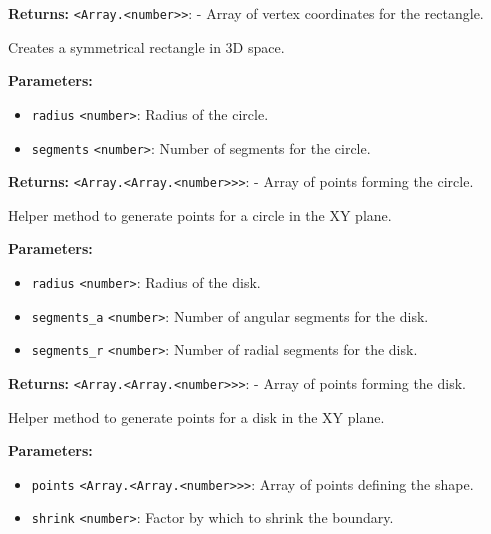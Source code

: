\documentclass[12pt,a4paper]{article}
\begin{document}
\noindent \textbf{Returns:} \texttt{<Array.<number>>}: - Array of vertex coordinates for the rectangle.

\noindent Creates a symmetrical rectangle in 3D space.

\vspace{5mm}
\noindent {}


\noindent \textbf{Parameters:}
\begin{itemize}
  \item \texttt{radius} \texttt{<number>}: Radius of the circle.
  \item \texttt{segments} \texttt{<number>}: Number of segments for the circle.
\end{itemize}

\noindent \textbf{Returns:} \texttt{<Array.<Array.<number>>>}: - Array of points forming the circle.

\noindent Helper method to generate points for a circle in the XY plane.

\vspace{5mm}
\noindent {}


\noindent \textbf{Parameters:}
\begin{itemize}
  \item \texttt{radius} \texttt{<number>}: Radius of the disk.
  \item \texttt{segments\_a} \texttt{<number>}: Number of angular segments for the disk.
  \item \texttt{segments\_r} \texttt{<number>}: Number of radial segments for the disk.
\end{itemize}

\noindent \textbf{Returns:} \texttt{<Array.<Array.<number>>>}: - Array of points forming the disk.

\noindent Helper method to generate points for a disk in the XY plane.

\vspace{5mm}
\noindent {}


\noindent \textbf{Parameters:}
\begin{itemize}
  \item \texttt{points} \texttt{<Array.<Array.<number>>>}: Array of points defining the shape.
  \item \texttt{shrink} \texttt{<number>}: Factor by which to shrink the boundary.
\end{itemize}
\end{document}
